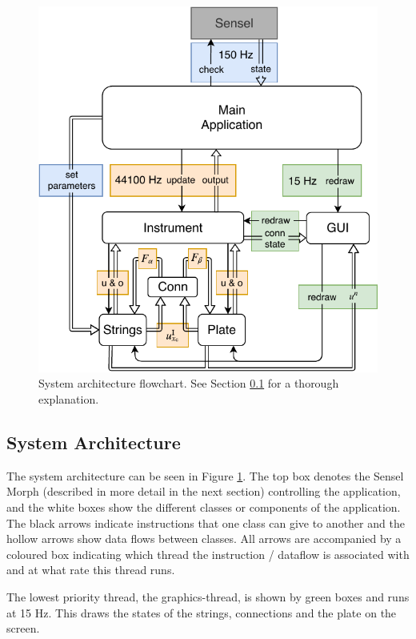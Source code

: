 \begin{figure}[h]
\centering
\includegraphics[width=\paperFigWidth\textwidth]{figures/JUCE.pdf}
\caption{System architecture flowchart. See Section \ref{sec:systemArch} for a thorough explanation. \label{fig:flowchart}}
\end{figure}

\subsection{System Architecture} \label{sec:systemArch}
The system architecture can be seen in Figure \ref{fig:flowchart}. The top box denotes the Sensel Morph (described in more detail in the next section) controlling the application, and the white boxes show the different classes or components of the application. The black arrows indicate instructions that one class can give to another and the hollow arrows show data flows between classes. All arrows are accompanied by a coloured box indicating which thread the instruction / dataflow is associated with and at what rate this thread runs.

The lowest priority thread, the graphics-thread, is shown by green boxes and runs at 15 Hz. This draws the states of the strings, connections and the plate on the screen.


